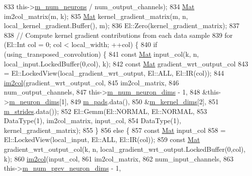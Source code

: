 \begin{DoxyCode}
833                    this->\hyperlink{classlbann_1_1Layer_a6b5ebc8a7d9329d8a773ed787e7b41d8}{m\_num\_neurons} / num\_output\_channels);
834     \hyperlink{base_8hpp_a68f11fdc31b62516cb310831bbe54d73}{Mat} im2col\_matrix(m, k);
835     \hyperlink{base_8hpp_a68f11fdc31b62516cb310831bbe54d73}{Mat} kernel\_gradient\_matrix(m, n, local\_kernel\_gradient.Buffer(), m);
836     El::Zero(kernel\_gradient\_matrix);
837 
838     \textcolor{comment}{// Compute kernel gradient contributions from each data sample}
839     \textcolor{keywordflow}{for} (El::Int col = 0; col < local\_width; ++col) \{
840       \textcolor{keywordflow}{if} (using\_transposed\_convolution) \{
841         \textcolor{keyword}{const} \hyperlink{base_8hpp_a68f11fdc31b62516cb310831bbe54d73}{Mat} input\_col(k, n, local\_input.LockedBuffer(0,col), k);
842         \textcolor{keyword}{const} \hyperlink{base_8hpp_a68f11fdc31b62516cb310831bbe54d73}{Mat} gradient\_wrt\_output\_col
843           = El::LockedView(local\_gradient\_wrt\_output, El::ALL, El::IR(col));
844         \hyperlink{namespacelbann_aa3636a1979e40da2af91f30a12b90db9}{im2col}(gradient\_wrt\_output\_col,
845                im2col\_matrix,
846                num\_output\_channels,
847                this->\hyperlink{classlbann_1_1Layer_adfd6178d21498c9095cd947ae1eb2d6a}{m\_num\_neuron\_dims} - 1,
848                &this->\hyperlink{classlbann_1_1Layer_abb34bb8031f57a483e2e327a5f229f48}{m\_neuron\_dims}[1],
849                \hyperlink{classlbann_1_1base__convolution__layer_a9732a8a0170a413bf0cde0128ad2a571}{m\_pads}.data(),
850                &\hyperlink{classlbann_1_1base__convolution__layer_a283edb6a476f975e713d0b4235ac658f}{m\_kernel\_dims}[2],
851                \hyperlink{classlbann_1_1base__convolution__layer_a2429495822363e41f1f6b96a6b430445}{m\_strides}.data());
852         El::Gemm(El::NORMAL, El::NORMAL,
853                  DataType(1), im2col\_matrix, input\_col,
854                  DataType(1), kernel\_gradient\_matrix);
855       \}
856       \textcolor{keywordflow}{else} \{
857         \textcolor{keyword}{const} \hyperlink{base_8hpp_a68f11fdc31b62516cb310831bbe54d73}{Mat} input\_col
858           = El::LockedView(local\_input, El::ALL, El::IR(col));
859         \textcolor{keyword}{const} \hyperlink{base_8hpp_a68f11fdc31b62516cb310831bbe54d73}{Mat} gradient\_wrt\_output\_col(k, n, local\_gradient\_wrt\_output.LockedBuffer(0,col), k);
860         \hyperlink{namespacelbann_aa3636a1979e40da2af91f30a12b90db9}{im2col}(input\_col,
861                im2col\_matrix,
862                num\_input\_channels,
863                this->\hyperlink{classlbann_1_1Layer_adc052afb38f170e839db00d3c8151d1e}{m\_num\_prev\_neuron\_dims} - 1,

\end{DoxyCode}
